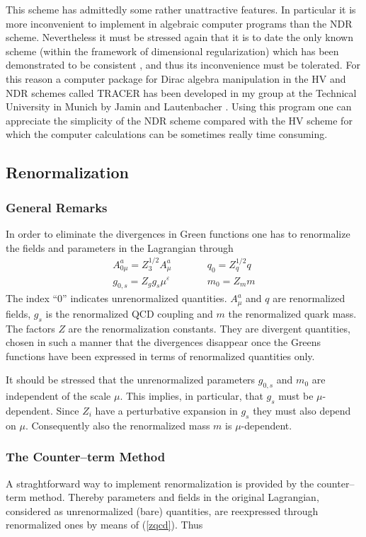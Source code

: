 \documentclass[12pt,rotate]{article}
\newcommand{\eqn}{\ref}
\begin{document}
\begin{itemize}
 This scheme has admittedly some rather unattractive features.
 In particular it is more
 inconvenient to implement in algebraic computer programs than the
NDR scheme. Nevertheless it
 must
 be stressed again that it is to date the only known scheme (within the
 framework of dimensional regularization) which has been demonstrated to be
 consistent \cite{BM,Bo}, and thus its inconvenience must be tolerated.
For this reason a computer package for Dirac algebra manipulation in 
the HV and NDR
schemes called TRACER has been developed in my group at the Technical
University in Munich by Jamin and Lautenbacher \cite{JaLau}. 
Using this program
one can appreciate the simplicity of the NDR scheme compared with
the HV scheme for which the computer calculations can be sometimes 
really time consuming.

\subsection{Renormalization}
\subsubsection{General Remarks}
In order to eliminate the divergences in Green functions one has to 
renormalize the fields and
parameters in the Lagrangian through
\begin{equation}\label{zqcd}
\begin{array}{lcl}
A^a_{0\mu}=Z^{1/2}_3 A^a_\mu &\qquad& q_0=Z^{1/2}_q q 
 \\
g_{0,s}=Z_g g_s\mu^\varepsilon &\qquad& m_0=Z_m m
\end{array}
\end{equation}
The index ``0'' indicates unrenormalized quantities. $A^a_\mu$ and $q$
are renormalized fields, $g_s$ is the renormalized QCD coupling and $m$
the renormalized quark mass. 
The factors $Z$
are the renormalization constants. They are divergent quantities,
chosen in such a manner that the divergences disappear once the
Greens functions have been expressed in terms of renormalized
quantities only. 

It should be stressed that the unrenormalized parameters
$g_{0,s}$ and $m_0$ are independent of the scale $\mu$. This
implies, in particular, that $g_s$ must be $\mu$-dependent.
Since $Z_i$ have a perturbative expansion in $g_s$ they must
also depend on $\mu$. Consequently also the renormalized mass
$m$ is $\mu$-dependent.
\subsubsection{The Counter--term Method}
A straghtforward way to implement renormalization is provided by the
counter--term method.
Thereby parameters and fields in the
original Lagrangian, considered as unrenormalized
(bare) quantities, are reexpressed through renormalized ones by
means of (\eqn{zqcd}). Thus 


\end{itemize}
\end{document}
